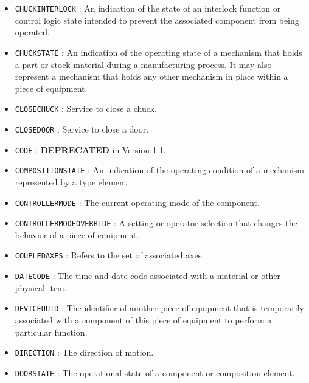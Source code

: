 \begin{itemize}
\item \texttt{CHUCK\textunderscore INTERLOCK} : An indication of the state of an interlock function or control logic state intended to prevent the associated  component from being operated. 

\item \texttt{CHUCK\textunderscore STATE} : An indication of the operating state of a mechanism that holds a part or stock material during a manufacturing process. It may also represent a mechanism that holds any other mechanism in place within a piece of equipment. 

\item \texttt{CLOSE\textunderscore CHUCK} : Service to close a chuck. 

\item \texttt{CLOSE\textunderscore DOOR} : Service to close a door. 

\item \texttt{CODE} : \textbf{DEPRECATED} in Version 1.1. 

\item \texttt{COMPOSITION\textunderscore STATE} : An indication of the operating condition of a mechanism represented by a  type element. 

\item \texttt{CONTROLLER\textunderscore MODE} : The current operating mode of the  component. 

\item \texttt{CONTROLLER\textunderscore MODE\textunderscore OVERRIDE} : A setting or operator selection that changes the behavior of a piece of equipment. 

\item \texttt{COUPLED\textunderscore AXES} : Refers to the set of associated axes. 

\item \texttt{DATE\textunderscore CODE} : The time and date code associated with a material or other physical item. 

\item \texttt{DEVICE\textunderscore UUID} : The identifier of another piece of equipment that is temporarily associated with a component of this piece of equipment to perform a particular function. 

\item \texttt{DIRECTION} : The direction of motion. 

\item \texttt{DOOR\textunderscore STATE} : The operational state of a  component or composition element. 


\end{itemize}

